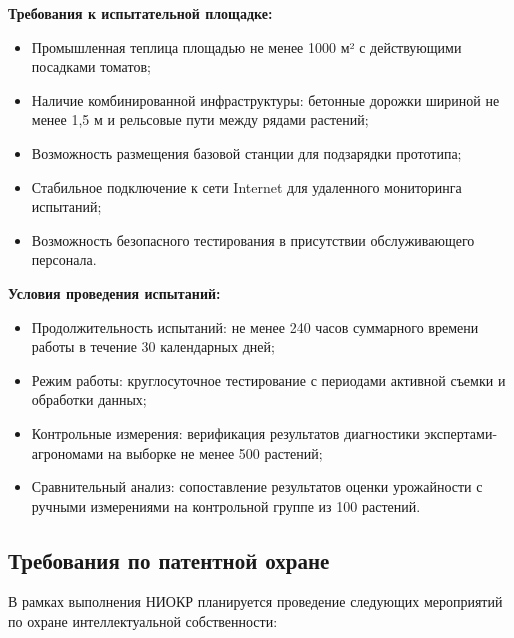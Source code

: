 \documentclass[12pt,a4paper]{article}
\begin{document}
\textbf{Требования к испытательной площадке:}
\begin{itemize}
\item Промышленная теплица площадью не менее 1000 м² с действующими посадками томатов;
\item Наличие комбинированной инфраструктуры: бетонные дорожки шириной не менее 1,5 м и рельсовые пути между рядами растений;
\item Возможность размещения базовой станции для подзарядки прототипа;
\item Стабильное подключение к сети Internet для удаленного мониторинга испытаний;
\item Возможность безопасного тестирования в присутствии обслуживающего персонала.
\end{itemize}

\textbf{Условия проведения испытаний:}
\begin{itemize}
\item Продолжительность испытаний: не менее 240 часов суммарного времени работы в течение 30 календарных дней;
\item Режим работы: круглосуточное тестирование с периодами активной съемки и обработки данных;
\item Контрольные измерения: верификация результатов диагностики экспертами-агрономами на выборке не менее 500 растений;
\item Сравнительный анализ: сопоставление результатов оценки урожайности с ручными измерениями на контрольной группе из 100 растений.
\end{itemize}

\subsection{Требования по патентной охране}

В рамках выполнения НИОКР планируется проведение следующих мероприятий по охране интеллектуальной собственности:
\end{document}
